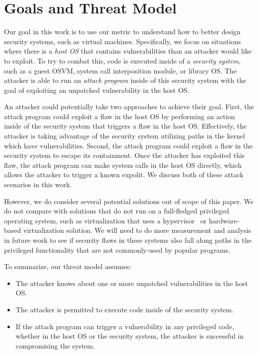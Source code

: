 \section{Goals and Threat Model}
\label{sec.motivation-and-background}

Our goal in this work is to use our metric to understand how to better design
security systems, such as virtual machines.  Specifically, we focus on 
situations where there is a \emph{host OS} that contains vulnerabilities
than an attacker would like to exploit.  To try to combat this, 
code is executed inside of a \emph{security system}, such as a guest OSVM, 
system call interposition module, or library OS.  The attacker is able to
run an \emph{attack program} inside of this security system with the goal of
exploiting an unpatched vulnerability in the host OS. 

An attacker could potentially take two approaches to achieve their
goal.  First, the attack program could exploit a flaw in the host OS by 
performing an action inside of the security system that triggers a flaw in
the host OS.  Effectively, the attacker is taking advantage of the security 
system utilizing paths in the kernel which have vulnerabilities.
Second, the attack program could exploit a flaw in the security system to 
escape its containment.  Once the attacker has exploited this flaw, the
attack program can make system calls in the host OS directly, which allows
the attacker to trigger a known expolit.  We discuss both of these attack 
scenarios in this work.


However, we do consider several potential solutions out of scope of this
paper.  We do not compare with solutions that do not run on a full-fledged 
privileged operating system, such as virtualization that uses a 
hypervisor~ or hardware-based virtualization 
solution.  We will need to do more measurement and analysis
in future work to see if security flaws in these systems also fall along
paths in the privileged functionality that are not commonly-used by popular
programs.

To summarize, our threat model assumes:

\begin{itemize}
\item The attacker knows about one or more unpatched vulnerabilities in the 
host OS.

\item The attacker is permitted to execute code inside of the security
system.

\item If the attack program can trigger a vulnerability in any privileged code,
whether in the host OS or the security system, the attacker is successful in 
compromising the system.

\end{itemize}

